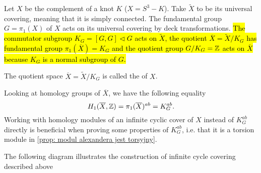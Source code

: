 Let $X$ be the complement of a knot $K$ ($X=S^3-K$). Take $\widetilde{X}$ to be its universal covering, meaning that it is simply connected. The fundamental group $G=\pi_1(X)$ of $X$ acts on its universal covering by deck transformations. \hl{The commutator subgroup $K_G=[G, G]\triangleleft G$ acts on $\widetilde{X}$, the quotient $\overline{X}=\widetilde{X}/K_G$ has fundamental group $\pi_1(\overline{X})=K_G$ and the quotient group $G/K_G=\operatorname{\mathbb{Z}}$ acts on $\overline{X}$ because $K_G$ is a normal subgroup of $G$.}

\begin{definition}\label{inf cyclic cover}
  The quotient space {\boldmath$\overline{X}=\widetilde{X}/K_G$} is called the  of $X$.
\end{definition}

Looking at homology groups of $\overline{X}$, we have the following equality
$$H_1(\overline{X}, \operatorname{\mathbb{Z}})=\pi_1(\overline{X})^{ab}=K_G^{ab}.$$
Working with homology modules of an infinite cyclic cover of $X$ instead of $K_G^{ab}$ directly is beneficial when proving some properties of $K_G^{ab}$, i.e. that it is a torsion module in \cref{prop: modul alexandera jest torsyjny}. 

The following diagram illustrates the construction of infinite cycle covering described above

\def\actson{
  \begin{tikzpicture}[baseline]
    \draw[->](0, 0) arc (-120:180:.5em);
  \end{tikzpicture}
}

\begin{center}
\end{center}

%

